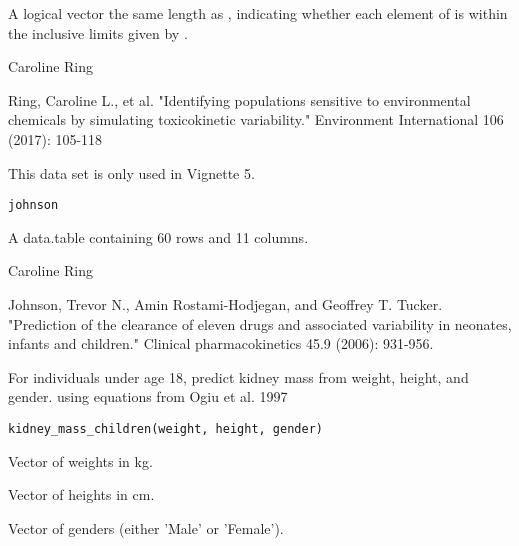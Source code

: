 \documentclass[a4paper]{book}
\begin{document}
%
\begin{Value}
A logical vector the same length as , indicating whether
each element of  is within the inclusive limits given by
.
\end{Value}
%
\begin{Author}\relax
Caroline Ring
\end{Author}
%
\begin{References}\relax
Ring, Caroline L., et al. "Identifying populations sensitive to
environmental chemicals by simulating toxicokinetic variability."
Environment International 106 (2017): 105-118
\end{References}
%
\begin{Description}\relax
This data set is only used in Vignette 5.
\end{Description}
%
\begin{Usage}
\begin{verbatim}
johnson
\end{verbatim}
\end{Usage}
%
\begin{Format}
A data.table containing 60 rows and 11 columns.
\end{Format}
%
\begin{Author}\relax
Caroline Ring
\end{Author}
%
\begin{References}\relax
Johnson, Trevor N., Amin Rostami-Hodjegan, and Geoffrey T. Tucker.
"Prediction of the clearance of eleven drugs and associated variability in
neonates, infants and children." Clinical pharmacokinetics 45.9 (2006):
931-956.
\end{References}
%
\begin{Description}\relax
For individuals under age 18, predict kidney mass from weight, height, and
gender. using equations from Ogiu et al. 1997
\end{Description}
%
\begin{Usage}
\begin{verbatim}
kidney_mass_children(weight, height, gender)
\end{verbatim}
\end{Usage}
%
\begin{Arguments}
\begin{ldescription}
\item[\code{weight}] Vector of weights in kg.

\item[\code{height}] Vector of heights in cm.

\item[\code{gender}] Vector of genders (either 'Male' or 'Female').
\end{ldescription}
\end{Arguments}
\end{document}
